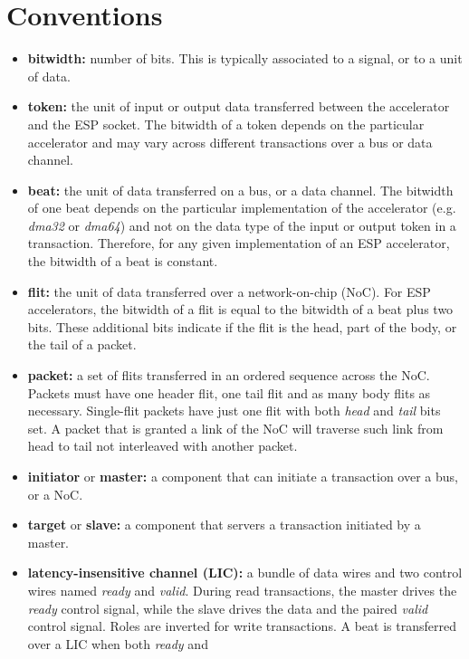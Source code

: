 \section{Conventions}

\begin{itemize}
  \item {\bf bitwidth:} number of bits. This is typically associated to a
    signal, or to a unit of data.
  \item {\bf token:} the unit of input or output data transferred between the
    accelerator and the ESP socket. The bitwidth of a token depends on the
    particular accelerator and may vary across different transactions over a bus
    or data channel.
  \item {\bf beat:} the unit of data transferred on a bus, or a  data
    channel. The bitwidth of one beat depends on the particular implementation
    of the accelerator (e.g. {\it dma32} or {\it dma64}) and not on the data
    type of the input or output token in a transaction. Therefore, for any given
    implementation of an ESP accelerator, the bitwidth of a beat is constant.
  \item {\bf flit:} the unit of data transferred over a network-on-chip
    (NoC). For ESP accelerators, the bitwidth of a flit is equal to the bitwidth
    of a beat plus two bits. These additional bits indicate if the flit is the
    head, part of the body, or the tail of a packet.
  \item {\bf packet:} a set of flits transferred in an ordered sequence across
    the NoC. Packets must have one header flit, one tail flit and as many body
    flits as necessary. Single-flit packets have just one flit with both {\it
      head} and {\it tail} bits set. A packet that is granted a link of the NoC
    will traverse such link from head to tail not interleaved with another
    packet.
  \item {\bf initiator} or {\bf master:} a component that can initiate a
    transaction over a bus, or a NoC.
  \item {\bf target} or {\bf slave:} a component that servers a transaction
    initiated by a master.
  \item {\bf latency-insensitive channel (LIC):} a bundle of data wires and two
    control wires named {\it ready} and {\it valid}. During read transactions,
    the master drives the {\it ready} control signal, while the slave drives the
    data and the paired {\it valid} control signal. Roles are inverted for write
    transactions. A beat is transferred over a LIC when both {\it ready} and

\end{itemize}

